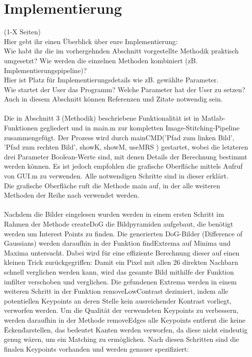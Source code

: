 \documentclass[deutsch]{scrartcl}
\begin{document}
\section{Implementierung}
(1-X Seiten)\\
Hier gebt ihr einen Überblick über eure Implementierung:\\
Wie habt ihr die im vorhergehnden Abschnitt vorgestellte Methodik praktisch umgesetzt? Wie werden die einzelnen Methoden kombiniert (zB. Implementierungspipeline)?\\
Hier ist Platz für Implementierungsdetails wie zB. gewählte Parameter. \\
Wie startet der User das Programm? Welche Parameter hat der User zu setzen?\\
Auch in diesem Abschnitt können Referenzen und Zitate notwendig sein.\\\\
Die in Abschnitt 3 (Methodik) beschriebene Funktionalität ist in
Matlab-Funktionen gegliedert und in main.m zur kompletten
Image-Stitching-Pipeline zusammengefügt. Der Prozess wird durch mainCMD('Pfad
zum linken Bild', 'Pfad zum rechten Bild', showK, showM, useMRS ) gestartet,
wobei die letzteren drei Parameter Boolean-Werte sind, mit denen Details der
Berechnung bestimmt werden können.
Es ist jedoch empfohlen die grafische Oberfläche mittels Aufruf
von GUI.m zu verwenden.
Alle notwendigen Schritte sind in dieser erklärt.\\
Die grafische Oberfläche ruft die Methode main auf, in der alle weiteren
Methoden der Reihe nach verwendet werden. \\\\
Nachdem die Bilder eingelesen wurden werden in einem ersten Schritt im Rahmen
der Methode createDoG die Bildpyramiden aufgebaut, die benötigt werden um
Interest Points zu finden. Die generierten DoG-Bilder (Difference of
Gaussians) werden daraufhin in der Funktion findExtrema auf Minima und
Maxima untersucht. Dabei wird für eine effiziente Berechnung dieser auf
einen kleinen Trick zurückgegriffen: Damit ein Pixel mit allen 26 direkten
Nachbarn schnell verglichen werden kann, wird das gesamte Bild mithilfe der
Funktion imfilter verschoben und verglichen. Die gefundenen Extrema werden
in einem weiteren Schritt in der Funktion removeLowContrast dezimiert, indem
alle potentiellen Keypoints an deren Stelle kein ausreichender Kontrast
vorliegt, verworfen werden. Um die Qualität der verwendeten Keypoints zu
verbessern, werden daraufhin in der Methode removeEdges alle Keypoints
entfernt die keine \"Ecken\" darstellen, das bedeutet Kanten werden
verworfen, da diese nicht eindeutig genug wären, um ein Matching zu
ermöglichen. Nach diesen Schritten sind die finalen Keypoints vorhanden und
werden genauer spezifiziert:\\\\
\end{document}
